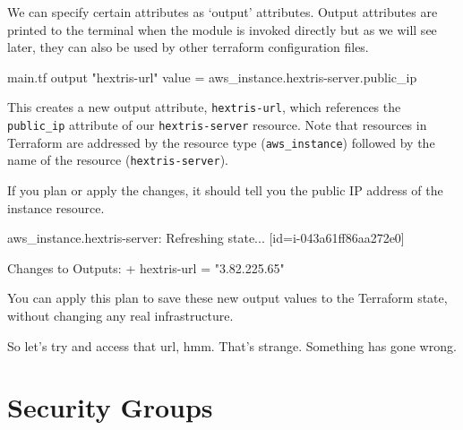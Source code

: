 \documentclass{csse4400}
\begin{document}
We can specify certain attributes as `output' attributes.
Output attributes are printed to the terminal when the module is invoked directly
but as we will see later, they can also be used by other terraform configuration files.

\begin{code}[language=terraform]{main.tf}
output "hextris-url" {
  value = aws_instance.hextris-server.public_ip
}
\end{code}

This creates a new output attribute, \texttt{hextris-url},
which references the \texttt{public\_ip} attribute of our \texttt{hextris-server} resource.
Note that resources in Terraform are addressed by the resource type (\texttt{aws\_instance})
followed by the name of the resource (\texttt{hextris-server}).

If you plan or apply the changes, it should tell you the public IP address of the instance resource.

\begin{code}[language=terraform-plan]{}
aws_instance.hextris-server: Refreshing state... [id=i-043a61ff86aa272e0]

Changes to Outputs:
  + hextris-url = "3.82.225.65"
\end{code}

You can apply this plan to save these new output values to the Terraform state, without changing any real infrastructure.  

So let's try and access that url, hmm.
That's strange. Something has gone wrong.

\section{Security Groups}


\end{document}
